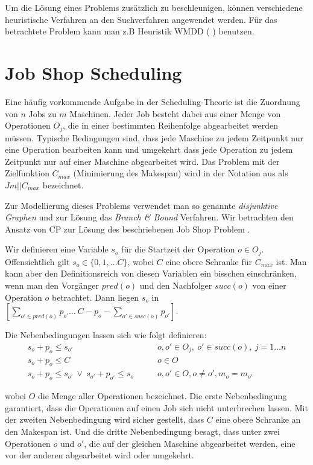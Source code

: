 Um die Lösung eines Problems zusätzlich zu beschleunigen, können verschiedene heuristische Verfahren an den Suchverfahren angewendet werden. Für das betrachtete Problem kann man z.B Heuristik WMDD ( \grqq)  \citep[siehe][]{WMDD} benutzen.

\section{Job Shop Scheduling}

Eine häufig vorkommende Aufgabe in der Scheduling-Theorie ist die Zuordnung von $n$ Jobs zu $m$ Maschinen. Jeder Job besteht dabei aus einer Menge von Operationen $O_j$, die in einer bestimmten Reihenfolge abgearbeitet werden müssen. Typische Bedingungen sind, dass jede Maschine zu jedem Zeitpunkt nur eine Operation bearbeiten kann und umgekehrt dass jede Operation zu jedem Zeitpunkt nur auf einer Maschine abgearbeitet wird. Das Problem mit der Zielfunktion $C_{max}$ (Minimierung des Makespan) wird in der 	Notation aus \cite{Pinedo} als $Jm||C_{max}$ bezeichnet.

Zur Modellierung dieses Problems verwendet man so genannte {\it disjunktive Graphen} und zur Lösung das {\it Branch \& Bound} Verfahren. Wir betrachten den Ansatz von CP zur Lösung des beschriebenen Job Shop Problem \citep[vgl.][]{CSP}.

Wir definieren eine Variable $s_o$ für die Startzeit der Operation $o\in O_j$. Offensichtlich gilt $s_o\in \{0,1,\dots C\}$, wobei $C$ eine obere Schranke für $C_{max}$ ist. Man kann aber den Definitionsreich von diesen Variablen ein bisschen einschränken, wenn man den Vorgänger $pred(o)$ und den Nachfolger $succ(o)$ von einer Operation $o$ betrachtet. Dann liegen $s_o$ in $[\sum_{o'\in pred(o)}p_{o'}\dots\ C-p_o-\sum_{o'\in succ(o)}p_{o'}]$.

Die Nebenbedingungen lassen sich wie folgt definieren:
\begin{align}
  s_o + p_o \le s_{o'} &\qquad  o,o'\in O_j,\ o'\in succ(o),\ j=1\dots n \nonumber \\
  s_o + p_o \le C &\qquad  o\in O \nonumber \\
  s_o + p_o \le s_{o'}\ \vee\ s_{o'} + p_{o'} \le s_{o} &\qquad o,o'\in O, o\not=o', m_o=m_{o'} \nonumber 
\end{align}

wobei $O$ die Menge aller Operationen bezeichnet.
Die erste Nebenbedingung garantiert, dass die Operationen auf einen Job sich nicht unterbrechen lassen. Mit der zweiten Nebenbedingung wird sicher gestellt, dass $C$ eine obere Schranke an den Makespan ist. Und die dritte Nebenbedingung besagt, dass unter zwei Operationen $o$ und $o'$, die auf der gleichen Maschine abgearbeitet werden, eine vor der anderen abgearbeitet wird oder umgekehrt.

